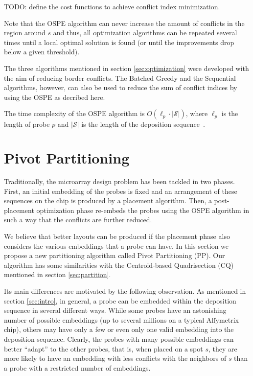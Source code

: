\documentclass{llncs}
\begin{document}
TODO: define the cost functions to achieve conflict index minimization.

Note that the OSPE algorithm can never increase the amount of conflicts in the region
around $s$ and thus, all optimization algorithms can be repeated several times until
a local optimal solution is found (or until the improvements drop below a given threshold).

The three algorithms mentioned in section \ref{sec:optimization} were developed with
the aim of reducing border conflicts. The Batched Greedy and the Sequential algorithms,
however, can also be used to reduce the sum of conflict indices by using the OSPE as
decribed here.

The time complexity of the OSPE algorithm is $O(\ell_p \cdot |\mathcal{S}|)$,
where $\ell_p$ is the length of probe $p$ and $|\mathcal{S}|$ is the length of
the deposition sequence~\cite{KAHNG02}.

\section{Pivot Partitioning}
\label{sec:pivotpart}

Traditionally, the microarray design problem has been tackled in two phases. First,
an initial embedding of the probes is fixed and an arrangement of these sequences
on the chip is produced by a placement algorithm. Then, a post-placement optimization
phase re-embeds the probes using the OSPE algorithm in such a way that the conflicts
are further reduced.

We believe that better layouts can be produced if the placement phase also considers
the various embeddings that a probe can have. In this section we propose a new
partitioning algorithm called Pivot Partitioning (PP). Our algorithm
has some similarities with the Centroid-based Quadrisection (CQ) mentioned
in section \ref{sec:partition}.

Its main differences are motivated by the following observation.
As mentioned in section \ref{sec:intro}, in general, a probe can be embedded
within the deposition sequence in several different ways. While some probes have an
astonishing number of possible embeddings (up to several millions on a typical
Affymetrix chip), others may have only a few or even only one valid embedding into
the deposition sequence. Clearly, the probes with many possible embeddings can better
``adapt'' to the other probes, that is, when placed on a spot $s$, they are more likely
to have an embedding with less conflicts with the neighbors of $s$ than a probe with a
restricted number of embeddings.
\end{document}
